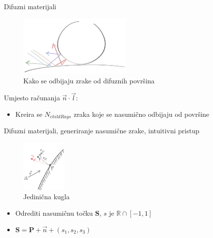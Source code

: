 \documentclass[9pt]{beamer}
\begin{document}
\begin{frame}{Difuzni materijali}
\begin{figure}
	\includegraphics[width=0.5\textwidth]{./slike/light-bounce.png}
	\caption{Kako se odbijaju zrake od difuznih površina}
\end{figure}
Umjesto računanja $\vec{n}\cdot \vec{l}$:
\begin{itemize}
	\item Kreira se $N_{childRays}$ zraka koje se nasumično odbijaju od površine
\end{itemize}
\end{frame}

\begin{frame}{Difuzni materijali, generiranje nasumične zrake, intuitivni pristup}
\begin{figure}
	\includegraphics[width=0.2\textwidth]{./slike/rand-vector2.png}
	\caption{Jedinična kugla}
\end{figure}

\begin{itemize}
	\item Odrediti nasumičnu točku $\mathbf{S}$, $s$ je $\mathbb{R} \cap \left[-1, 1\right]$ 
	\item $\mathbf{S} = \mathbf{P} + \vec{n} + (s_1, s_2, s_3)$
\end{itemize}
\end{frame}
\end{document}
